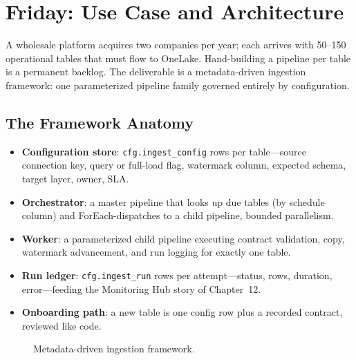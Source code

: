 \section{Friday: Use Case and Architecture}
A wholesale platform acquires two companies per year; each arrives with 50--150 operational tables that must flow to OneLake. Hand-building a pipeline per table is a permanent backlog. The deliverable is a metadata-driven ingestion framework: one parameterized pipeline family governed entirely by configuration.

\subsection{The Framework Anatomy}
\begin{itemize}
    \item \textbf{Configuration store}: \texttt{cfg.ingest\_config} rows per table---source connection key, query or full-load flag, watermark column, expected schema, target layer, owner, SLA.
    \item \textbf{Orchestrator}: a master pipeline that looks up due tables (by schedule column) and ForEach-dispatches to a child pipeline, bounded parallelism.
    \item \textbf{Worker}: a parameterized child pipeline executing contract validation, copy, watermark advancement, and run logging for exactly one table.
    \item \textbf{Run ledger}: \texttt{cfg.ingest\_run} rows per attempt---status, rows, duration, error---feeding the Monitoring Hub story of Chapter~12.
    \item \textbf{Onboarding path}: a new table is one config row plus a recorded contract, reviewed like code.
\end{itemize}

\begin{figure}[H]
    \centering
    \caption{Metadata-driven ingestion framework.}
    \label{fig:chapter9-framework}
\end{figure}

